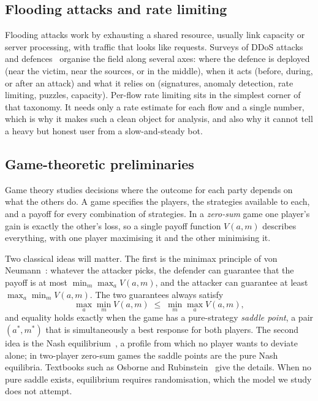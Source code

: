 \documentclass[conference]{IEEEtran}
\begin{document}
\subsection{Flooding attacks and rate limiting}
Flooding attacks work by exhausting a shared resource, usually link capacity or server processing, with traffic that looks like requests. Surveys of DDoS attacks and defences~\cite{mirkovic2004,zargar2013} organise the field along several axes: where the defence is deployed (near the victim, near the sources, or in the middle), when it acts (before, during, or after an attack) and what it relies on (signatures, anomaly detection, rate limiting, puzzles, capacity). Per-flow rate limiting sits in the simplest corner of that taxonomy. It needs only a rate estimate for each flow and a single number, which is why it makes such a clean object for analysis, and also why it cannot tell a heavy but honest user from a slow-and-steady bot.

\subsection{Game-theoretic preliminaries}
Game theory studies decisions where the outcome for each party depends on what the others do. A game specifies the players, the strategies available to each, and a payoff for every combination of strategies. In a \emph{zero-sum} game one player's gain is exactly the other's loss, so a single payoff function $V(a,m)$ describes everything, with one player maximising it and the other minimising it.

Two classical ideas will matter. The first is the minimax principle of von Neumann~\cite{vonneumann1928}: whatever the attacker picks, the defender can guarantee that the payoff is at most $\min_m \max_a V(a,m)$, and the attacker can guarantee at least $\max_a \min_m V(a,m)$. The two guarantees always satisfy
\begin{equation}
\max_{a}\min_{m} V(a,m)\;\le\;\min_{m}\max_{a} V(a,m),
\label{eq:maxmin}
\end{equation}
and equality holds exactly when the game has a pure-strategy \emph{saddle point}, a pair $(a^*,m^*)$ that is simultaneously a best response for both players. The second idea is the Nash equilibrium~\cite{nash1951}, a profile from which no player wants to deviate alone; in two-player zero-sum games the saddle points are the pure Nash equilibria. Textbooks such as Osborne and Rubinstein~\cite{osborne1994} give the details. When no pure saddle exists, equilibrium requires randomisation, which the model we study does not attempt.
\end{document}
